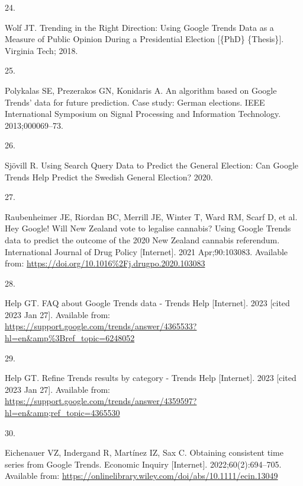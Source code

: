 \documentclass[
  letterpaper,
  DIV=11,
  numbers=noendperiod]{scrartcl}
\newlength{\cslhangindent}
\newlength{\csllabelwidth}
\newlength{\cslentryspacingunit} %
\newenvironment{CSLReferences}[2] %
 {%
  \setlength{\parindent}{0pt}
  \ifodd #1
  \let\oldpar\par
  \def\par{\hangindent=\cslhangindent\oldpar}
  \fi
  \setlength{\parskip}{#2\cslentryspacingunit}
 }%
 {}
\newcommand{\CSLLeftMargin}[1]{\parbox[t]{\csllabelwidth}{#1}}
\newcommand{\CSLRightInline}[1]{\parbox[t]{\linewidth - \csllabelwidth}{#1}\break}
\begin{document}
\begin{CSLReferences}{0}{0}
\leavevmode{}%
\CSLLeftMargin{24. }%
\CSLRightInline{Wolf JT. Trending in the {Right} {Direction}: {Using}
{Google} {Trends} {Data} as a {Measure} of {Public} {Opinion} {During} a
{Presidential} {Election} {[}\{PhD\} \{Thesis\}{]}. Virginia Tech; 2018.
}

\leavevmode{}%
\CSLLeftMargin{25. }%
\CSLRightInline{Polykalas SE, Prezerakos GN, Konidaris A. An algorithm
based on {Google} {Trends}' data for future prediction. {Case} study:
{German} elections. IEEE International Symposium on Signal Processing
and Information Technology. 2013;000069--73. }

\leavevmode{}%
\CSLLeftMargin{26. }%
\CSLRightInline{Sjövill R. Using {Search} {Query} {Data} to {Predict}
the {General} {Election}: {Can} {Google} {Trends} {Help} {Predict} the
{Swedish} {General} {Election}? 2020. }

\leavevmode{}%
\CSLLeftMargin{27. }%
\CSLRightInline{Raubenheimer JE, Riordan BC, Merrill JE, Winter T, Ward
RM, Scarf D, et al. Hey {Google}! Will {New} {Zealand} vote to legalise
cannabis? {Using} {Google} {Trends} data to predict the outcome of the
2020 {New} {Zealand} cannabis referendum. International Journal of Drug
Policy {[}Internet{]}. 2021 Apr;90:103083. Available from:
\url{https://doi.org/10.1016\%2Fj.drugpo.2020.103083}}

\leavevmode{}%
\CSLLeftMargin{28. }%
\CSLRightInline{Help GT. {FAQ} about {Google} {Trends} data - {Trends}
{Help} {[}Internet{]}. 2023 {[}cited 2023 Jan 27{]}. Available from:
\url{https://support.google.com/trends/answer/4365533?hl=en\&amp\%3Bref_topic=6248052}}

\leavevmode{}%
\CSLLeftMargin{29. }%
\CSLRightInline{Help GT. Refine {Trends} results by category - {Trends}
{Help} {[}Internet{]}. 2023 {[}cited 2023 Jan 27{]}. Available from:
\url{https://support.google.com/trends/answer/4359597?hl=en\&amp;ref_topic=4365530}}

\leavevmode{}%
\CSLLeftMargin{30. }%
\CSLRightInline{Eichenauer VZ, Indergand R, Martínez IZ, Sax C.
Obtaining consistent time series from {Google} {Trends}. Economic
Inquiry {[}Internet{]}. 2022;60(2):694--705. Available from:
\url{https://onlinelibrary.wiley.com/doi/abs/10.1111/ecin.13049}}


\end{CSLReferences}
\end{document}
